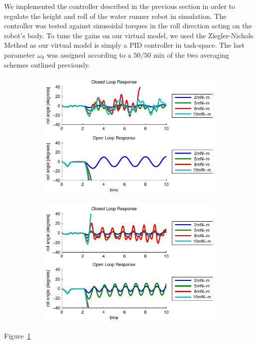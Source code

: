 We implemented the controller described in the previous section in order to regulate the height and roll of the water runner robot in simulation. The controller was tested against sinusoidal torques in the roll direction acting on the robot's body. To tune the gains on our virtual model, we used the Ziegler-Nichols Method as our virtual model is simply a PID controller in task-space. The last parameter $\omega_0$ was assigned according to a $50/50$ mix of the two averaging schemes outlined previously.

\begin{figure}[t]
    \centering
    \begin{subfigure}[b]{0.49\textwidth}
        \centering
        \includegraphics[width = \textwidth]{figures/torques_small.pdf}
        \caption{}
        \label{fig:results1Hz}
    \end{subfigure}
    \begin{subfigure}[b]{0.49\textwidth}
        \centering
        \includegraphics[width = \textwidth]{figures/torques_small2.pdf}
        \caption{}
        \label{fig:results2Hz}
    \end{subfigure}
    \caption{}
\end{figure}

Figure~\ref{fig:results1Hz}
